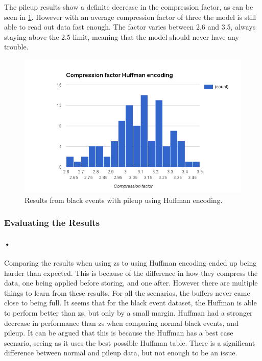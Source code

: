 \documentclass[a4paper, 12pt, openright, twoside]{report}
\begin{document}
The pileup results show a definite decrease in the compression factor, as can be seen in \ref{fig:comp-huffman-pileup}.
However with an average compression factor of three the model is still able to read out data fast enough.
The factor varies between 2.6 and 3.5, always staying above the 2.5 limit, meaning that the model should never have any trouble.

\begin{figure}[H]
	\centering
		\includegraphics[width=1.0\textwidth]{images/compression-factor-pileup-huffman.png}
		\caption{Results from black events with pileup using Huffman encoding.}
		\label{fig:comp-huffman-pileup}
\end{figure}

\subsubsection{Evaluating the Results}

\paragraph{•}
Comparing the results when using \gls{zs} to using Huffman encoding ended up being harder than expected.
This is because of the difference in how they compress the data, one being applied before storing, and one after.
However there are multiple things to learn from these results.
For all the scenarios, the buffers never came close to being full.
It seems that for the black event dataset, the Huffman is able to perform better than \gls{zs}, but only by a small margin.
Huffman had a stronger decrease in performance than \gls{zs} when comparing normal black events, and pileup.
It can be argued that this is because the Huffman has a best case scenario, seeing as it uses the best possible Huffman table.
There is a significant difference between normal and pileup data, but not enough to be an issue.
\end{document}
